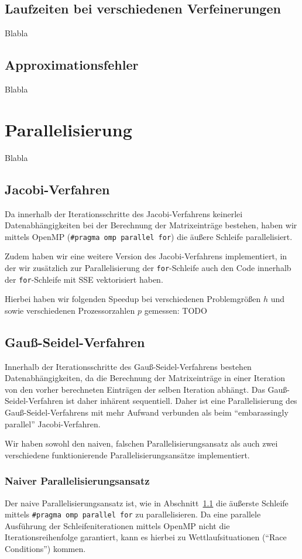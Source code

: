 \documentclass{article}
\begin{document}
\subsection{Laufzeiten bei verschiedenen Verfeinerungen}
Blabla
\subsection{Approximationsfehler}
Blabla

\section{Parallelisierung}
Blabla
\subsection{Jacobi-Verfahren} \label{parallel:jacobi}
Da innerhalb der Iterationsschritte des Jacobi-Verfahrens keinerlei Datenabhängigkeiten bei der Berechnung der Matrixeinträge bestehen, haben wir mittels OpenMP (\texttt{\#pragma omp parallel for}) die äußere Schleife parallelisiert.

Zudem haben wir eine weitere Version des Jacobi-Verfahrens implementiert, in der wir zusätzlich zur Parallelisierung der \texttt{for}-Schleife auch den Code innerhalb der \texttt{for}-Schleife mit SSE vektorisiert haben.

Hierbei haben wir folgenden Speedup bei verschiedenen Problemgrößen $h$ und sowie verschiedenen Prozessorzahlen $p$ gemessen: TODO

\subsection{Gauß-Seidel-Verfahren}

Innerhalb der Iterationsschritte des Gauß-Seidel-Verfahrens bestehen Datenabhängigkeiten, da die Berechnung der Matrixeinträge in einer Iteration von den vorher berechneten Einträgen der selben Iteration abhängt. Das Gauß-Seidel-Verfahren ist daher inhärent sequentiell. Daher ist eine Parallelisierung des Gauß-Seidel-Verfahrens mit mehr Aufwand verbunden als beim ``embarassingly parallel'' Jacobi-Verfahren.

Wir haben sowohl den naiven, falschen Parallelisierungsansatz als auch zwei verschiedene funktionierende Parallelisierungsansätze implementiert.

\subsubsection{Naiver Parallelisierungsansatz}\label{gs:naiv}
Der naive Parallelisierungsansatz ist, wie in Abschnitt~\ref{parallel:jacobi} die äußerste Schleife mittels \texttt{\#pragma omp parallel for} zu parallelisieren. Da eine parallele Ausführung der Schleifeniterationen mittels OpenMP nicht die Iterationsreihenfolge garantiert, kann es hierbei zu Wettlaufsituationen (``Race Conditions'') kommen.
\end{document}
